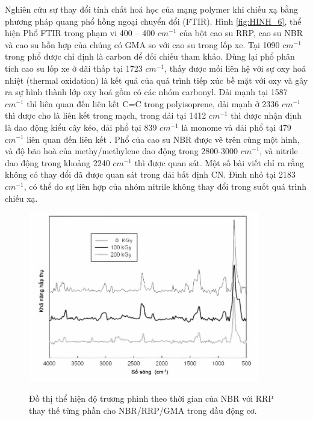 \documentclass[12pt,a4paper]{article}
\begin{document}
	Nghiên cứu sự thay đổi tính chất hoá học của mạng polymer khi chiếu xạ bằng phương pháp quang phổ hồng ngoại chuyển đổi (FTIR). Hình \ref{fig:HINH_6}, thể hiện Phổ FTIR trong phạm vi 400 – 400 $cm^{-1}$ của bột cao su RRP, cao su NBR và cao su hỗn hợp của chúng có GMA so với cao su trong lốp xe. Tại 1090 $cm^{-1}$ trong phổ được chỉ định là carbon để đối chiếu tham khảo. Dùng lại phổ phân tích cao su lốp xe ở dãi thấp tại 1723 $cm^{-1}$, thấy được mối liên hệ với sự oxy hoá nhiệt (thermal oxidation) là kết quả của quá trình tiếp xúc bề mặt với oxy và gây ra sự hình thành lớp oxy hoá gồm có các nhóm carbonyl. Dải mạnh tại 1587 $cm^{-1}$ thì liên quan đến liên kết C=C trong polyisoprene, dải mạnh ở 2336 $cm^{-1}$ thì được cho là liên kết  trong mạch, trong dải tại 1412 $cm^{-1}$ thì được nhận định là  dao động kiểu cây kéo, dải phổ tại 839 $cm^{-1}$ là monome \ch{[-C(CH3)=CH-]} và dải phổ tại 479 $cm^{-1}$ liên quan đến liên kết . Phổ của cao su NBR được vẽ trên cùng một hình, và độ bão hoà của methy/methylene dao động trong 2800-3000 $cm^{-1}$, và nitrile dao động trong khoảng 2240 $cm^{-1}$ thì được quan sát. Một số bài viết chỉ ra rằng không có thay đổi đã được quan sát trong dải bất định CN. Đỉnh nhỏ tại 2183 $cm^{-1}$, có thể do sự liên hợp của nhóm nitrile không thay đổi trong suốt quá trình chiếu xạ.\\
	
	\begin{figure}
			\centering
			\includegraphics[width=0.9\textwidth]{9.JPG}
			\label{fig:HINH_7}
			\caption{Đồ thị thể hiện độ trương phình theo thời gian của NBR với RRP thay thế từng phần cho NBR/RRP/GMA trong dầu động cơ.}
		\end{figure}
	
\end{document}
